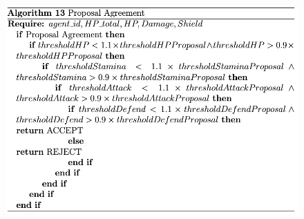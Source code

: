 

\begin{figure}[htb]
    \centering
    \includegraphics[scale=0.7]{006_team_3_agent_design/FIGS/Algo13.png}
    \label{fig:algo13}
\end{figure}

